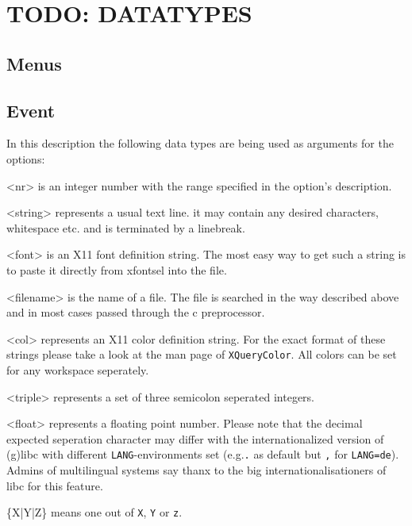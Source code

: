 \documentclass[10pt,a4paper]{article}
\newenvironment{ttdesc}[1]{
   \begin{list}{}{
          \renewcommand{\makelabel}[1]{\texttt{##1\hfill}}}}{\end{list}}
\begin{document}
\section*{TODO: DATATYPES}

\subsection{Menus}
\subsection{Event}

In this description the following data types are being used as arguments for the options:
\begin{ttdesc}{description}
\item[<nr>] is an integer number with the range specified in the option's description.
\item[<string>] represents a usual text line. it may contain any desired characters, whitespace etc. and is terminated by a linebreak.
\item[<font>] is an X11 font definition string. The most easy way to get such a string is to paste it directly from xfontsel into the file.
\item[<filename>] is the name of a file. The file is searched in the way described above and in most cases passed through the c preprocessor.
\item[<col>] represents an X11 color definition string. For the exact format of these strings please take a look at the man page of \texttt{XQueryColor}. All colors can be set for any workspace seperately.
\item[<triple>] represents a set of three semicolon seperated integers.
\item[<float>] represents a floating point number. Please note that the decimal expected seperation character may differ with the internationalized version of (g)libc with different \texttt{LANG}-environments set (e.g.\texttt{.} as default but \texttt{,} for \texttt{LANG=de}). Admins of multilingual systems say thanx to the big internationalisationers of libc for this feature.
\item[\{X|Y|Z\}] means one out of \texttt{X}, \texttt{Y} or \texttt{z}.
\end{ttdesc}
\end{document}
